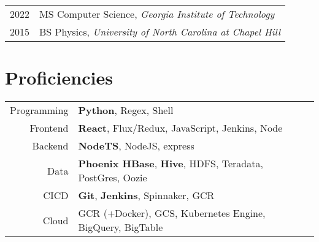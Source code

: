 \documentclass[a4paper,10pt]{article} %
\begin{document}
\begin{tabular}{rl}	
2022 & MS Computer Science, \emph{Georgia Institute of Technology}\\
2015 & BS Physics, \emph{University of North Carolina at Chapel Hill}\\




\end{tabular}
\bigskip

\vspace{-8pt}
\section{Proficiencies}

\begin{tabular}{rlp{11cm}}
Programming &\textbf{Python}, Regex, Shell\\
Frontend &\textbf{React}, Flux/Redux, JavaScript, Jenkins, Node\\
Backend &\textbf{NodeTS}, NodeJS, express\\
Data &\textbf{Phoenix HBase}, \textbf{Hive}, HDFS, Teradata, PostGres, Oozie\\
CICD &\textbf{Git}, \textbf{Jenkins}, Spinnaker, GCR\\
Cloud &GCR (+Docker), GCS, Kubernetes Engine, BigQuery, BigTable



\end{tabular}
\end{document}
